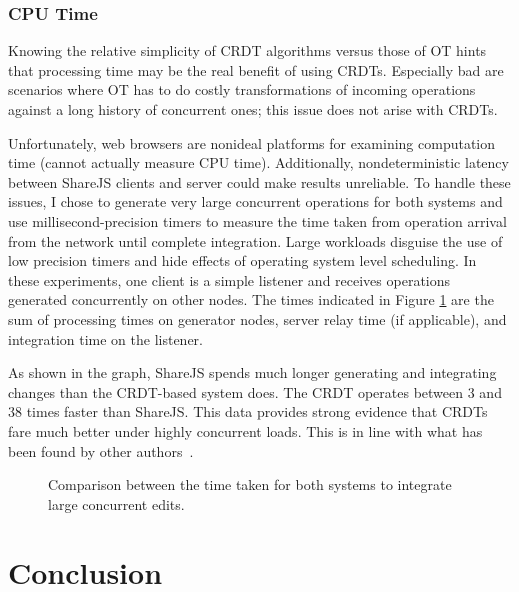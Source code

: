 \documentclass[12pt,a4paper,twoside,openright]{report}
\begin{document}
		
	
		\subsection{CPU Time}
			Knowing the relative simplicity of CRDT algorithms versus those of OT hints that processing time may be the real benefit of using CRDTs. Especially bad are scenarios where OT has to do costly transformations of incoming operations against a long history of concurrent ones; this issue does not arise with CRDTs.
			
			Unfortunately, web browsers are nonideal platforms for examining computation time (cannot actually measure CPU time). Additionally, nondeterministic latency between ShareJS clients and server could make results unreliable. To handle these issues, I chose to generate very large concurrent operations for both systems and use millisecond-precision timers to measure the time taken from operation arrival from the network until complete integration. Large workloads disguise the use of low precision timers and hide effects of operating system level scheduling. In these experiments, one client is a simple listener and receives operations generated concurrently on other nodes. The times indicated in Figure \ref{fig:cputime} are the sum of processing times on generator nodes, server relay time (if applicable), and integration time on the listener.
			
			As shown in the graph, ShareJS spends much longer generating and integrating changes than the CRDT-based system does. The CRDT operates between 3 and 38 times faster than ShareJS. This data provides strong evidence that CRDTs fare much better under highly concurrent loads. This is in line with what has been found by other authors~\cite{ahmed2011evaluating}.
			
			\begin{figure}[htb]
				\centering
				
				\caption[CPU Time] {Comparison between the time taken for both systems to integrate large concurrent edits.}
				\label{fig:cputime}
			\end{figure}		
	
		
		
		
		
		
		


\chapter{Conclusion}
\end{document}

